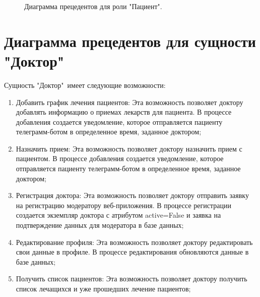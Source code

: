 \documentclass[14pt]{extreport}
\begin{document}
        \begin{figure}[H]%
            \centering
            \caption{Диаграмма прецедентов для роли "Пациент".} \label{patient_uml}
        \end{figure} 
    
    \section{Диаграмма прецедентов для сущности "Доктор"\ }
        Сущность "Доктор"\ имеет следующие возможности:
        \begin{enumerate}
            \item Добавить график лечения пациентов: Эта возможность %
            позволяет доктору добавлять информацию о приемах лекарств %
            для пациента. В процессе добавления создается уведомление, %
            которое отправляется пациенту телеграмм-ботом в определенное %
            время, заданное доктором;
            \item Назначить прием: Эта возможность позволяет доктору %
            назначить прием с пациентом. В процессе добавления создается %
            уведомление, которое отправляется пациенту телеграмм-ботом в %
            определенное время, заданное доктором;
            \item Регистрация доктора: Эта возможность позволяет доктору %
            отправить заявку на регистрацию модератору веб-приложения. %
            В процессе регистрации создается экземпляр доктора с %
            атрибутом active=False и заявка на подтверждение данных %
            для модератора в базе данных;
            \item Редактирование профиля: Эта возможность позволяет доктору %
            редактировать свои данные в профиле. В процессе редактирования %
            обновляются данные в базе данных;
            \item Получить список пациентов: Эта возможность позволяет доктору %
            получить список лечащихся и уже прошедших лечение пациентов;
        \end{enumerate}
        
\end{document}
